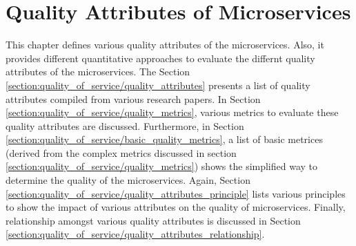 
\begin{comment}
comment from Manoj
- try to reference ISO/IEC 9126 for the quality attributes: refer to the slides sent by Manoj on Nov 02
- Also include the formula of the metrics and discuss about them and simplify them: refer to the slides sent by Manoj on Nov 02
- The quality attributes which can make more sense according to the priority to microservices: refer to the slides sent by Manoj on Nov 02
- Relationship between the quality attributes and their tradeoffs, what happens when we try to increase cohesion.. how it affect other attributes?
- create wiki page in the sebis page to document the literature review.

comment from Andrea
- mention about coupling created by calling same database directly by multiple microservice
use the formula to calculate quality metrics for the services at hybris to give an idea about good and bad service, the process of finding out good service at first and then using the quality metrics finding out the range of quality metrics, which can then be used to identify bad services
\end{comment}



\chapter{Quality Attributes of Microservices}\label{chapter:quality_of_service}
This chapter defines various quality attributes of the microservices. Also, it provides different quantitative approaches to evaluate the differnt quality attributes of the microservices. The Section \ref{section:quality_of_service/quality_attributes} presents a list of quality attributes compiled from various research papers. In Section \ref{section:quality_of_service/quality_metrics}, various metrics to evaluate these quality attributes are discussed. Furthermore, in Section \ref{section:quality_of_service/basic_quality_metrics}, a list of basic metrices (derived from the complex metrics discussed in section \ref{section:quality_of_service/quality_metrics}) shows the simplified way to determine the quality of the microservices. Again, Section \ref{section:quality_of_service/quality_attributes_principle} lists various principles to show the impact of various attributes on the quality of microservices. Finally, relationship amongst various quality attributes is discussed in Section \ref{section:quality_of_service/quality_attributes_relationship}.

